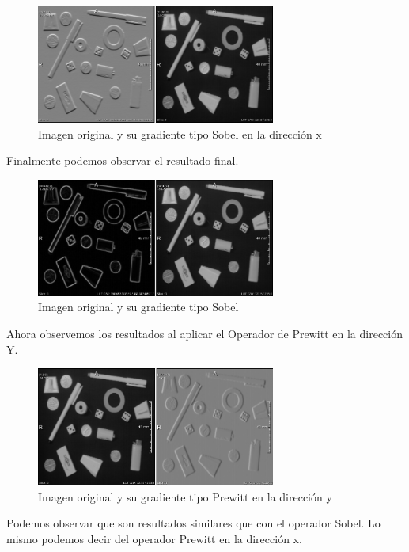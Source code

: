 \documentclass{article}
\begin{document}
\begin{figure}[ht]
\begin{center}
\includegraphics[width=0.7\textwidth]{1Filtros/1_sobel_x_orig.png} %
\caption{Imagen original y su gradiente tipo Sobel en la dirección x}
\label{fg:sobel_x}
\end{center}
\end{figure}
\FloatBarrier

Finalmente podemos observar el resultado final.

\begin{figure}[ht]
\begin{center}
\includegraphics[width=0.7\textwidth]{1Filtros/1_sobel_grad.png} %
\caption{Imagen original y su gradiente tipo Sobel}
\label{fg:sobel_grad}
\end{center}
\end{figure}
\FloatBarrier

Ahora observemos los resultados al aplicar el Operador de Prewitt en la dirección Y.

\begin{figure}[ht]
\begin{center}
\includegraphics[width=0.7\textwidth]{1Filtros/1_prew_y.png} %
\caption{Imagen original y su gradiente tipo Prewitt en la dirección y}
\label{fg:prew_y}
\end{center}
\end{figure}
\FloatBarrier
Podemos observar que son resultados similares que con el operador Sobel. Lo mismo podemos
decir del operador Prewitt en la dirección x.
\end{document}
